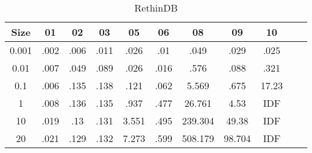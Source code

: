 \begin{center}
\begin{comment}
\end{tabular}
\begin{tabular}{|c|c|c|c|c|c|c|c|c|c|c| } 
Size & 11 & 12 & 13 & 14 & 15 & 16 & 17 & 18 & 19 & 20	\\
\hline
0001 & 0.029 & 0.004 & 0.001 & 0.001 & 0.001 & 0.001 & 0.001 & 0 & 0.002 & 0.001	\\
001 & 0.192 & 0.047 & 0.002 & 0 & 0.003 & 0.001 & 0.002 & 0.001 & 0.004 & 0.002	\\
01 & 4.351 & 0.861 & 0.007 & 0.002 & 0.013 & 0.014 & 0.005 & 0.004 & 0.014 & 0.011	\\
1 & 345.299 & 62.648 & 0.018 & 0.008 & 0.073 & 0.089 & 0.039 & 0.025 & 0.084 & 0.089	\\
5 & 0 & 0 & 0.276 & 2.311 & 0.111 & 0.098 & 0.131 & 0.861 & 2.11 & 0.602	\\
10 & 0 & 0 & 2.066 & 3.998 & 0.135 & 0.074 & 0.156 & 0.854 & 16.448 & 1.36	\\
20 & 0 & 0 & 5.281 & 8.202 & 0.126 & 0.072 & 0.174 & 0.854 & 34.448 & 2.858	\\

\end{tabular}
\end{table}
\end{comment}

\begin{table} [ht]
\tiny
\caption{RethinDB}
\label{rethink-query-result-table}
\begin{tabular}{|c|c|c|c|c|c|c|c|c|c|c| } 
Size  & 01 & 02 & 03 & 05 & 06 & 08 & 09 & 10 \\
  \hline
0.001 & .002 & .006 & .011 & .026 & .01 & .049 & .029 & .025 \\
0.01 & .007 & .049 & .089 & .026 & .016 & .576 & .088 & .321 \\
0.1 & .006 & .135 & .138 & .121 & .062 & 5.569 & .675 & 17.23 \\
1 & .008 & .136 & .135 & .937 & .477 & 26.761 & 4.53 & IDF \\
10 & .019 & .13 & .131 & 3.551 & .495 & 239.304 & 49.38 & IDF \\
20 & .021 & .129 & .132 & 7.273 & .599 & 508.179 & 98.704 & IDF \\


\end{tabular}
\end{table}
\end{center}
